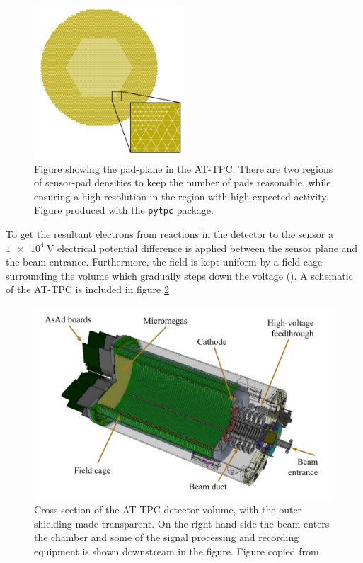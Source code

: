  \begin{figure}
\centering
\includegraphics[width=0.5\textwidth]{../plots/at_tpc_padplane}
\caption{Figure showing the pad-plane in the AT-TPC. There are two regions of sensor-pad densities to keep the number of pads reasonable, while ensuring a high resolution in the region with high expected activity. Figure produced with the \lstinline{pytpc} package.}\label{fig:attpc_padplane}
 \end{figure}

 To get the resultant electrons from reactions in the detector to the sensor a $\SI{1e4}{\volt}$ electrical potential difference is applied between the sensor plane and the beam entrance. Furthermore, the field is kept uniform by a field cage surrounding the volume which gradually steps down the voltage (\cite{Bradt2017a}). A schematic of the AT-TPC is included in figure \ref{fig:attpc_schematic}

 \begin{figure}
 \centering
 \includegraphics[width=\textwidth]{../plots/at_tpc_schematic}
 \caption[AT-TPC cross-section]{Cross section of the AT-TPC detector volume, with the outer shielding made transparent. On the right hand side the beam enters the chamber and some of the signal processing and recording equipment is shown downstream in the figure. Figure copied from \cite{Bradt2017a}}\label{fig:attpc_schematic}
 \end{figure}

